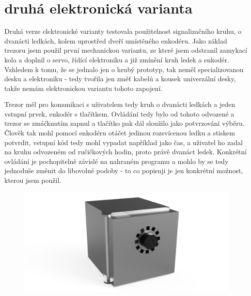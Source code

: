 \section*{druhá elektronická varianta}

Druhá verze elektronické varianty testovala použitelnost signalizačního kruhu, o dvanácti ledkách, kolem uprostřed dveří
umístěného enkodéru. Jako základ trezoru jsem použil první mechanickou variantu, ze které jsem odstranil zamykací kola 
a doplnil o servo, řídící elektroniku a již zmínění kruh ledek a enkodér.
Vzhledem k tomu, že se jednalo jen o hrubý prototyp, tak neměl specializovanou desku a elektroniku - tedy tvořila jen změť kabelů 
a kousek univerzální desky, takže nemám elektronickou variantu tohoto zapojení. %

Trezor měl pro komunikaci s uživatelem tedy kruh o dvanácti ledkách a jeden vstupní prvek, enkodér s tlačítkem.
Ovládání tedy bylo od tohoto odvozené a trezor se zmáčknutím zapnul a tlačítko pak dál sloužilo jako potvrzování výběru.
Člověk tak mohl pomocí enkodéru otáčet jedinou rozsvícenou ledku a stiskem potvrdit, vstupní kód tedy mohl vypadat 
například jako čas, a uživatel ho zadal na kruhu odvozeném od ručičkových hodin, proto právě dvanáct ledek.
Konkrétní ovládání je pochopitelně závislé na nahraném programu a mohlo by se tedy jednoduše změnit do libovolné podoby -
to co popisuji je jen konkrétní možnost, kterou jsem použil.

\begin{figure}[htbp]
    \centering
    \includegraphics[width=\textwidth]{kapitoly/obrazky/E2-render.png}
    \label{fig:M1}
\end{figure}
\newpage
